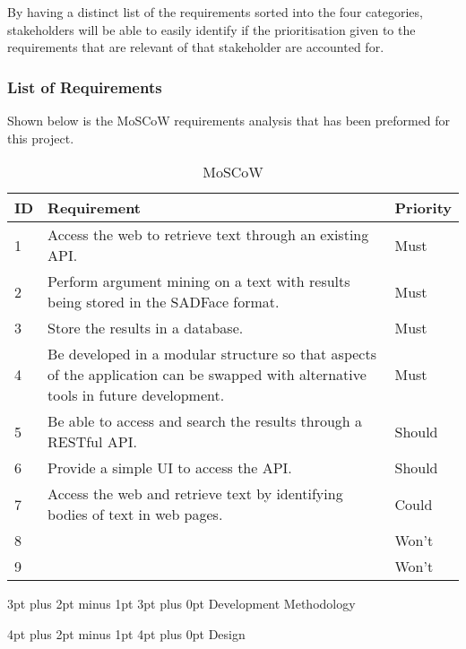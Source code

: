 \documentclass[12pt,a4paper]{article}
\makeatletter
\renewcommand\subsection{\@startsection {subsection}{1}{2mm} %
                               {3pt plus 2pt minus 1pt} %
                               {3pt plus 0pt} %
                               {\normalfont\bfseries}}
\renewcommand\section{\@startsection {section}{1}{0mm} %
                               {4pt plus 2pt minus 1pt} %
                               {4pt plus 0pt} %
                               {\bfseries}}
\makeatother
\begin{document}
By having a distinct list of the requirements sorted into the four categories, stakeholders will be able to easily identify if the prioritisation given to the requirements that are relevant of that stakeholder are accounted for.

\subsubsection{List of Requirements}

Shown below is the MoSCoW requirements analysis that has been preformed for this project.

\begin{table}[htbp]
    \centering
    \begin{tabular}{|p{1cm}|p{8cm}|p{2cm}|}
    \hline
    ID & Requirement & Priority\\
    \hline
    1 & Access the web to retrieve text through an existing API. & Must\\
    \hline
    2 & Perform argument mining on a text with results being stored in the SADFace format. & Must\\
    \hline
    3 & Store the results in a database. & Must\\
    \hline
    4 & Be developed in a modular structure so that aspects of the application can be swapped with alternative tools in future development. & Must\\
    \hline
    5 & Be able to access and search the results through a RESTful API. & Should\\
    \hline
    6 & Provide a simple UI to access the API. & Should\\
    \hline
    7 & Access the web and retrieve text by identifying bodies of text in web pages. & Could\\
    \hline
    8 &  & Won't\\
    \hline
    9 &  & Won't\\
    \hline
    \end{tabular}
    \caption{MoSCoW}
    \label{table:1}
\end{table}

\FloatBarrier

\subsection{Development Methodology}

\newpage
\section{Design}
\end{document}
